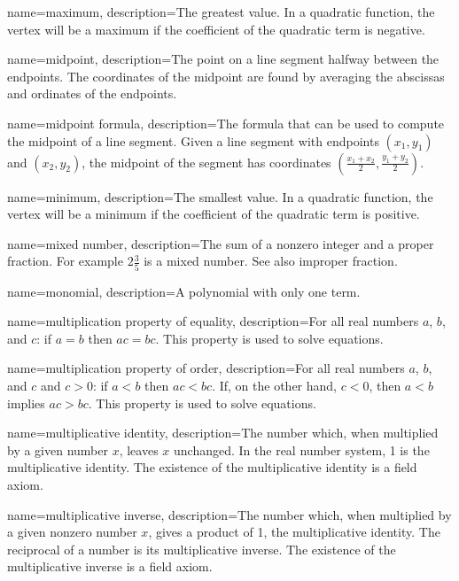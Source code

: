  {
	name=maximum,
	description={The greatest value. In a quadratic function, the vertex will be a maximum if the coefficient of the quadratic term is negative.}
}

 {
	name=midpoint,
	description={The point on a line segment halfway between the endpoints. The coordinates of the midpoint are found by averaging the abscissas and ordinates of the endpoints.}
}

 {
	name=midpoint formula,
	description={The formula that can be used to compute the midpoint of a line segment. Given a line segment with endpoints $(x_1, y_1)$ and $(x_2, y_2)$, the midpoint of the segment has coordinates $\left( \frac{x_1+x_2}{2}, \frac{y_1+y_2}{2} \right)$.}
}

 {
	name=minimum,
	description={The smallest value. In a quadratic function, the vertex will be a minimum if the coefficient of the quadratic term is positive.}
}

 {
	name=mixed number,
	description={The sum of a nonzero \gls{integer} and a \gls{proper fraction}. For example $2\frac{3}{5}$ is a mixed number. See also \gls{improper fraction}.}
}

 {
	name=monomial,
	description={A polynomial with only one term.}
}

 {
	name=multiplication property of equality,
	description={For all real numbers $a$, $b$, and $c$: if $a = b$ then $ac = bc$. This property is used to solve equations.}
}

 {
	name=multiplication property of order,
	description={For all real numbers $a$, $b$, and $c$ and $c > 0$: if $a < b$ then $ac < bc$. If, on the other hand, $c < 0$, then $a < b$ implies $ac > bc$. This property is used to solve equations.}
}

 {
	name=multiplicative identity,
	description={The number which, when multiplied by a given number $x$, leaves $x$ unchanged. In the real number system, 1 is the multiplicative identity. The existence of the multiplicative identity is a \gls{field axiom}.}
}

 {
	name=multiplicative inverse,
	description={The number which, when multiplied by a given nonzero number $x$, gives a product of 1, the multiplicative identity. The reciprocal of a number is its multiplicative inverse. The existence of the multiplicative inverse is a \gls{field axiom}.}
}

